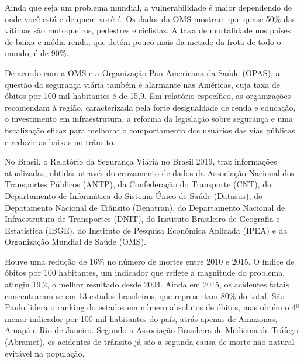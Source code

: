 \documentclass[output=paper,colorlinks,citecolor=green]{langscibook}
\begin{document}
Ainda que seja um problema mundial, a vulnerabilidade é maior dependendo de onde você está e de quem você é. Os dados da OMS mostram que quase 50\% das vítimas são motoqueiros, pedestres e ciclistas. A taxa de mortalidade nos países de baixa e média renda, que detém pouco mais da metade da frota de todo o mundo, é de 90\%.\vskip0.3cm

De acordo com a OMS e a Organização Pan-Americana da Saúde (OPAS), a questão da segurança viária também é alarmante nas Américas, cuja taxa de óbitos por 100 mil habitantes é de 15,9. Em relatório específico, as organizações recomendam à região, caracterizada pela forte desigualdade de renda e educação, o investimento em infraestrutura, a reforma da legislação sobre segurança e uma fiscalização eficaz para melhorar o comportamento dos usuários das vias públicas e reduzir as baixas no trânsito.\vskip0.3cm


No Brasil, o Relatório da Segurança Viária no Brasil 2019,  traz informações atualizadas, obtidas através do cruzamento de dados da Associação Nacional dos Transportes Públicos (ANTP), da Confederação do Transporte (CNT), do Departamento de Informática do Sistema Único de Saúde (Datasus), do Depatamento Nacional de Trânsito (Denatran), do Departamento Nacional de Infraestrutura de Transportes (DNIT), do Instituto Brasileiro de Geografia e Estatística (IBGE), do Instituto de Pesquisa Econômica Aplicada (IPEA) e da Organização Mundial de Saúde (OMS).\vskip0.3cm

Houve uma redução de 16\% no número de mortes entre 2010 e 2015. O índice de óbitos por 100 habitantes, um indicador que reflete a magnitude do problema, atingiu 19,2, o melhor resultado desde 2004. Ainda em 2015, os acidentes fatais concentraram-se em 13 estados brasileiros, que representam 80\% do total. São Paulo lidera o ranking do estados em número absolutos de óbitos, mas obtém o 4º menor indicador por 100 mil habitantes do país, atrás apenas de Amazonas, Amapá e Rio de Janeiro. Segundo a Associação Brasileira de Medicina de Tráfego (Abramet), os acidentes de trânsito já são a segunda causa de morte não natural evitável na população.\vskip0.3cm
\end{document}
